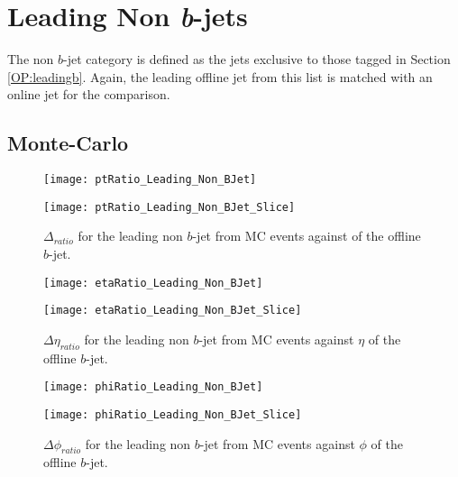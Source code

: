 \newpage
\section{Leading Non \textit{b}-jets}

	The non $b$-jet category is defined as the jets exclusive to those tagged in Section \ref{OP:leadingb}. Again, the leading \pt offline jet from this list is matched with an online jet for the comparison.

\newpage
	\subsection{Monte-Carlo}

		\begin{figure}[h]
			\centering
			\begin{minipage}[h]{0.33\linewidth}
				\texttt{[image: ptRatio\_Leading\_Non\_BJet]}

			\end{minipage}
			\quad
			\begin{minipage}[h]{0.33\linewidth}
				\texttt{[image: ptRatio\_Leading\_Non\_BJet\_Slice]}
			\end{minipage}
			\caption{$\Delta $\pt$_{ratio}$ for the leading \pt non $b$-jet from MC events against \pt of the offline $b$-jet. }
			\label{fig:MC:nonleadingbpt}
		\end{figure}

		\begin{figure}[h]
			\centering

			\begin{minipage}[h]{0.33\linewidth}
				\texttt{[image: etaRatio\_Leading\_Non\_BJet]}
			\end{minipage}
			\quad
			\begin{minipage}[h]{0.33\linewidth}
				\texttt{[image: etaRatio\_Leading\_Non\_BJet\_Slice]}
			\end{minipage}
			\caption{$\Delta \eta_{ratio}$ for the leading \pt non $b$-jet from MC events against $\eta$ of the offline $b$-jet. }
			\label{fig:MC:nonleadingbeta}
		\end{figure}

		\begin{figure}[h]
			\centering

			\begin{minipage}[h]{0.33\linewidth}
				\texttt{[image: phiRatio\_Leading\_Non\_BJet]}
			\end{minipage}
			\quad
			\begin{minipage}[h]{0.33\linewidth}
				\texttt{[image: phiRatio\_Leading\_Non\_BJet\_Slice]}
			\end{minipage}
			\caption{$\Delta \phi_{ratio}$ for the leading \pt non $b$-jet from MC events against $\phi$ of the offline $b$-jet. }
			\label{fig:MC:nonleadingbphi}
		\end{figure}

